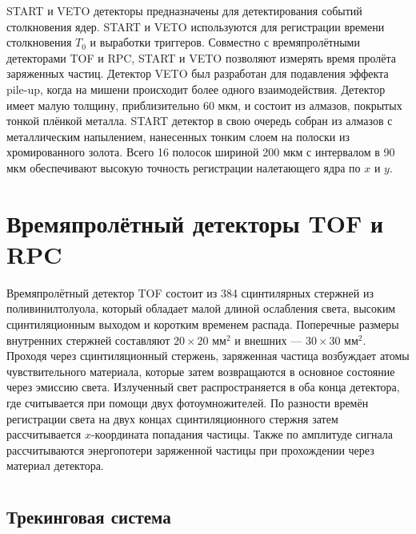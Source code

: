 START и VETO детекторы предназначены для детектирования событий столкновения ядер.
START и VETO используются для регистрации времени столкновения $T_0$ и выработки триггеров.
Совместно с времяпролётными детекторами TOF и RPC, START и VETO позволяют измерять время пролёта заряженных частиц.
Детектор VETO был разработан для подавления эффекта pile-up, когда на мишени происходит более одного взаимодействия.
Детектор имеет малую толщину, приблизительно 60 мкм, и состоит из алмазов, покрытых тонкой плёнкой металла. 
START детектор в свою очередь собран из алмазов с металлическим напылением, нанесенных тонким слоем на полоски из хромированного золота.
Всего 16 полосок шириной 200 мкм с интервалом в 90 мкм обеспечивают высокую точность регистрации налетающего ядра по $x$ и $y$.

\section{Времяпролётный детекторы TOF и RPC}

Времяпролётный детектор TOF состоит из 384 сцинтилярных стержней из поливинилтолуола, который обладает малой длиной ослабления света, высоким сцинтиляционным выходом и коротким временем распада.
Поперечные размеры внутренних стержней составляют $20 \times 20$ мм$^2$ и внешних --- $30\times30$ мм$^2$.
Проходя через сцинтиляционный стержень, заряженная частица возбуждает атомы чувствительного материала, которые затем возвращаются в основное состояние через эмиссию света.
Излученный свет распространяется в оба конца детектора, где считывается при помощи двух фотоумножителей.
По разности времён регистрации света на двух концах сцинтиляционного стержня затем рассчитывается $x$-координата попадания частицы.
Также по амплитуде сигнала рассчитываются энергопотери заряженной частицы при прохождении через материал детектора.

\section{}

\subsection{ Трекинговая система }

